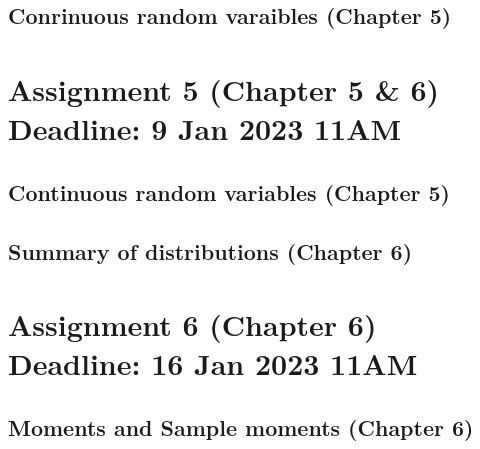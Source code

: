 \subsection{Conrinuous random varaibles (\textbf{Chapter 5})}





\section{Assignment 5 (Chapter 5 \& 6) \textbf{Deadline: 9 Jan 2023 11AM}}

\subsection{Continuous random variables (\textbf{Chapter 5})}




\newpage
\subsection{Summary of distributions (\textbf{Chapter 6}) }



\section{Assignment 6 (Chapter 6) \textbf{Deadline: 16 Jan 2023 11AM}}

\subsection{Moments and Sample moments (\textbf{Chapter 6})}

